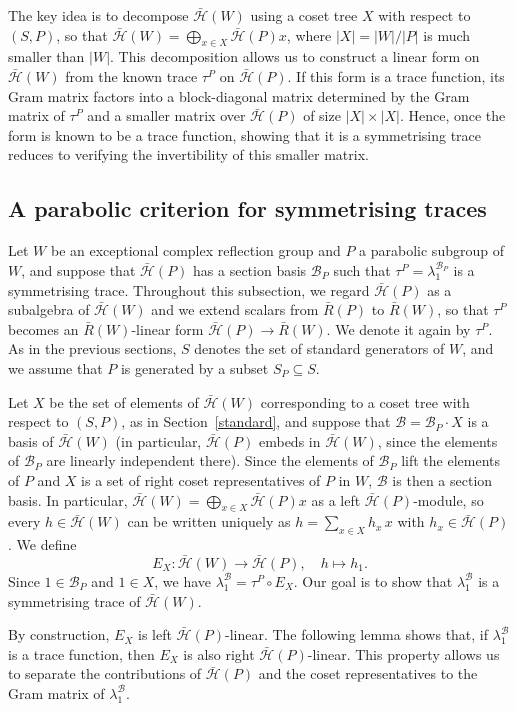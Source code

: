 \documentclass[11pt, reqno]{amsart}
\newcommand{\cB}{\mathcal{B}}
\newcommand{\cH}{\mathcal{H}}
\numberwithin{equation}{section}
\theoremstyle{remark}
\begin{document}
The key idea is to decompose $\bar{\cH}(W)$ using a coset tree $X$ with respect to $(S,P)$, so that $\bar{\cH}(W)=\bigoplus_{x\in X}\bar{\cH}(P)x$, where $|X|=|W|/|P|$ is much smaller than $|W|$. This decomposition allows us to construct a linear form on $\bar{\cH}(W)$ from the known trace $\tau^P$ on $\bar{\cH}(P)$. If this form is a trace function, its Gram matrix factors into a block-diagonal matrix determined by the Gram matrix of $\tau^P$ and a smaller matrix over $\bar{\cH}(P)$ of size $|X|\times|X|$. Hence, once the form is known to be a trace function, showing that it is a symmetrising trace reduces to verifying the invertibility of this smaller matrix.

\subsection{A parabolic criterion for symmetrising traces}\label{parcr}
Let $W$ be an exceptional complex reflection group and $P$ a parabolic
subgroup of $W$, and suppose that $\bar{\cH}(P)$ has a section basis
$\cB_P$ such that $\tau^P=\lambda_1^{\cB_P}$ is a
symmetrising trace.
Throughout this subsection, we regard $\bar{\cH}(P)$ as a subalgebra of $\bar{\cH}(W)$ and we extend scalars from $\bar R(P)$ to $\bar R(W)$, so that $\tau^P$ becomes an $\bar R(W)$-linear form $\bar{\cH}(P)\to \bar R(W)$. We denote it again by $\tau^P$. As in the previous sections, $S$ denotes the set of standard generators of $W$, and we assume that $P$ is generated by a subset $S_P\subseteq S$.

Let $X$ be the set of elements of $\bar{\cH}(W)$ corresponding to a coset tree with respect to $(S,P)$, as in Section~\ref{standard}, and suppose that $\cB=\cB_P\cdot X$ is a basis of $\bar{\cH}(W)$ (in particular, $\bar{\cH}(P)$ embeds in
$\bar{\cH}(W)$, since the elements of $\cB_P$ are linearly
independent there). Since the elements of $\cB_P$ lift the elements of $P$ and $X$ is a set of right coset representatives of $P$ in $W$, $\cB$ is then a section basis. In particular, $\bar{\cH}(W)=\bigoplus_{x\in X}\bar{\cH}(P)x$ as a left $\bar{\cH}(P)$-module, so every $h\in\bar{\cH}(W)$ can be written uniquely as $h=\sum_{x\in X}h_x\,x$ with $h_x\in\bar{\cH}(P)$. We define
$$E_X\colon\bar{\cH}(W)\to\bar{\cH}(P),\quad h\mapsto h_1.$$
Since $1\in\cB_P$ and $1\in X$, we have $\lambda_1^{\cB}=\tau^P\circ E_X$. Our goal is to show that $\lambda_1^{\cB}$ is a symmetrising trace of $\bar{\cH}(W)$.

By construction, $E_X$ is left $\bar{\cH}(P)$-linear. The following lemma shows that, if $\lambda_1^{\cB}$ is a trace function, then $E_X$ is also right $\bar{\cH}(P)$-linear. This property allows us to separate the contributions of $\bar{\cH}(P)$ and the coset representatives to the Gram matrix of $\lambda_1^{\cB}$.
\end{document}
